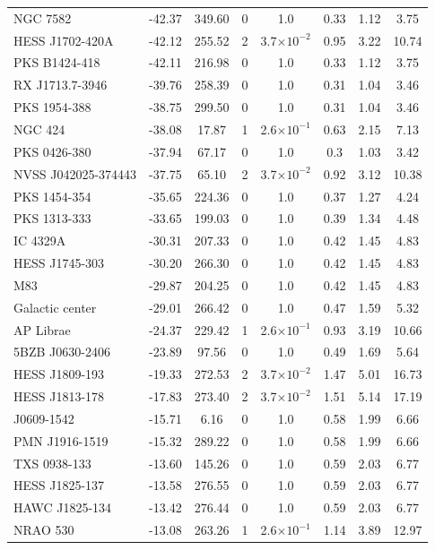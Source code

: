 \begin{longtable}{lccccccc}
NGC 7582	&	-42.37	&	349.60	&	0	&	1.0	&	0.33	&	1.12	&	3.75	\\ 
HESS J1702-420A	&	-42.12	&	255.52	&	2	&	3.7$\times 10^{-2}$	&	0.95	&	3.22	&	10.74	\\ 
PKS B1424-418	&	-42.11	&	216.98	&	0	&	1.0	&	0.33	&	1.12	&	3.75	\\ 
RX J1713.7-3946	&	-39.76	&	258.39	&	0	&	1.0	&	0.31	&	1.04	&	3.46	\\ 
PKS 1954-388	&	-38.75	&	299.50	&	0	&	1.0	&	0.31	&	1.04	&	3.46	\\ 
NGC 424	&	-38.08	&	17.87	&	1	&	2.6$\times 10^{-1}$	&	0.63	&	2.15	&	7.13	\\ 
PKS 0426-380	&	-37.94	&	67.17	&	0	&	1.0	&	0.3	&	1.03	&	3.42	\\ 
NVSS J042025-374443	&	-37.75	&	65.10	&	2	&	3.7$\times 10^{-2}$	&	0.92	&	3.12	&	10.38	\\ 
PKS 1454-354	&	-35.65	&	224.36	&	0	&	1.0	&	0.37	&	1.27	&	4.24	\\ 
PKS 1313-333	&	-33.65	&	199.03	&	0	&	1.0	&	0.39	&	1.34	&	4.48	\\ 
IC 4329A	&	-30.31	&	207.33	&	0	&	1.0	&	0.42	&	1.45	&	4.83	\\ 
HESS J1745-303	&	-30.20	&	266.30	&	0	&	1.0	&	0.42	&	1.45	&	4.83	\\ 
M83	&	-29.87	&	204.25	&	0	&	1.0	&	0.42	&	1.45	&	4.83	\\ 
Galactic center	&	-29.01	&	266.42	&	0	&	1.0	&	0.47	&	1.59	&	5.32	\\ 
AP Librae	&	-24.37	&	229.42	&	1	&	2.6$\times 10^{-1}$	&	0.93	&	3.19	&	10.66	\\ 
5BZB J0630-2406	&	-23.89	&	97.56	&	0	&	1.0	&	0.49	&	1.69	&	5.64	\\ 
HESS J1809-193	&	-19.33	&	272.53	&	2	&	3.7$\times 10^{-2}$	&	1.47	&	5.01	&	16.73	\\ 
HESS J1813-178	&	-17.83	&	273.40	&	2	&	3.7$\times 10^{-2}$	&	1.51	&	5.14	&	17.19	\\ 
J0609-1542	&	-15.71	&	6.16	&	0	&	1.0	&	0.58	&	1.99	&	6.66	\\ 
PMN J1916-1519	&	-15.32	&	289.22	&	0	&	1.0	&	0.58	&	1.99	&	6.66	\\ 
TXS 0938-133	&	-13.60	&	145.26	&	0	&	1.0	&	0.59	&	2.03	&	6.77	\\ 
HESS J1825-137	&	-13.58	&	276.55	&	0	&	1.0	&	0.59	&	2.03	&	6.77	\\ 
HAWC J1825-134	&	-13.42	&	276.44	&	0	&	1.0	&	0.59	&	2.03	&	6.77	\\ 
NRAO 530	&	-13.08	&	263.26	&	1	&	2.6$\times 10^{-1}$	&	1.14	&	3.89	&	12.97	\\ 

\end{longtable}
